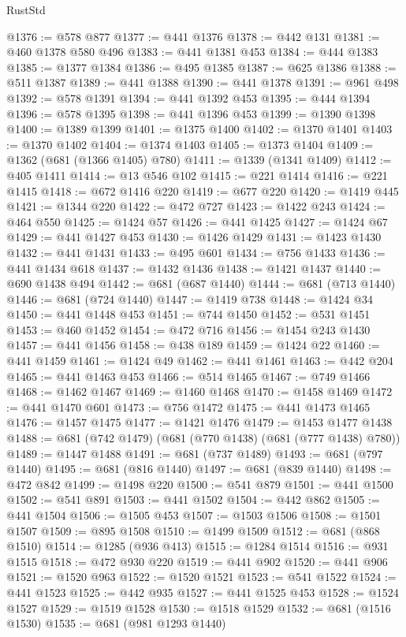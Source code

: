 \begin{lexlean}{RustStd}
\begin{coremodule}
@1376 := @578 @877
@1377 := @441 @1376
@1378 := @442 @131
@1381 := @460 @1378 @580 @496
@1383 := @441 @1381 @453
@1384 := @444 @1383
@1385 := @1377 @1384
@1386 := @495 @1385
@1387 := @625 @1386
@1388 := @511 @1387
@1389 := @441 @1388
@1390 := @441 @1378
@1391 := @961 @498
@1392 := @578 @1391
@1394 := @441 @1392 @453
@1395 := @444 @1394
@1396 := @578 @1395
@1398 := @441 @1396 @453
@1399 := @1390 @1398
@1400 := @1389 @1399
@1401 := @1375 @1400
@1402 := @1370 @1401
@1403 := @1370 @1402
@1404 := @1374 @1403
@1405 := @1373 @1404
@1409 := @1362 (@681 (@1366 @1405) @780)
@1411 := @1339 (@1341 @1409)
@1412 := @405 @1411
@1414 := @13 @546 @102
@1415 := @221 @1414
@1416 := @221 @1415
@1418 := @672 @1416 @220
@1419 := @677 @220
@1420 := @1419 @445
@1421 := @1344 @220
@1422 := @472 @727
@1423 := @1422 @243
@1424 := @464 @550
@1425 := @1424 @57
@1426 := @441 @1425
@1427 := @1424 @67
@1429 := @441 @1427 @453
@1430 := @1426 @1429
@1431 := @1423 @1430
@1432 := @441 @1431
@1433 := @495 @601
@1434 := @756 @1433
@1436 := @441 @1434 @618
@1437 := @1432 @1436
@1438 := @1421 @1437
@1440 := @690 @1438 @494
@1442 := @681 (@687 @1440)
@1444 := @681 (@713 @1440)
@1446 := @681 (@724 @1440)
@1447 := @1419 @738
@1448 := @1424 @34
@1450 := @441 @1448 @453
@1451 := @744 @1450
@1452 := @531 @1451
@1453 := @460 @1452
@1454 := @472 @716
@1456 := @1454 @243 @1430
@1457 := @441 @1456
@1458 := @438 @189
@1459 := @1424 @22
@1460 := @441 @1459
@1461 := @1424 @49
@1462 := @441 @1461
@1463 := @442 @204
@1465 := @441 @1463 @453
@1466 := @514 @1465
@1467 := @749 @1466
@1468 := @1462 @1467
@1469 := @1460 @1468
@1470 := @1458 @1469
@1472 := @441 @1470 @601
@1473 := @756 @1472
@1475 := @441 @1473 @1465
@1476 := @1457 @1475
@1477 := @1421 @1476
@1479 := @1453 @1477 @1438
@1488 := @681 (@742 @1479) (@681 (@770 @1438) (@681 (@777 @1438) @780))
@1489 := @1447 @1488
@1491 := @681 (@737 @1489)
@1493 := @681 (@797 @1440)
@1495 := @681 (@816 @1440)
@1497 := @681 (@839 @1440)
@1498 := @472 @842
@1499 := @1498 @220
@1500 := @541 @879
@1501 := @441 @1500
@1502 := @541 @891
@1503 := @441 @1502
@1504 := @442 @862
@1505 := @441 @1504
@1506 := @1505 @453
@1507 := @1503 @1506
@1508 := @1501 @1507
@1509 := @895 @1508
@1510 := @1499 @1509
@1512 := @681 (@868 @1510)
@1514 := @1285 (@936 @413)
@1515 := @1284 @1514
@1516 := @931 @1515
@1518 := @472 @930 @220
@1519 := @441 @902
@1520 := @441 @906
@1521 := @1520 @963
@1522 := @1520 @1521
@1523 := @541 @1522
@1524 := @441 @1523
@1525 := @442 @935
@1527 := @441 @1525 @453
@1528 := @1524 @1527
@1529 := @1519 @1528
@1530 := @1518 @1529
@1532 := @681 (@1516 @1530)
@1535 := @681 (@981 @1293 @1440)

\end{coremodule}
\end{lexlean}
